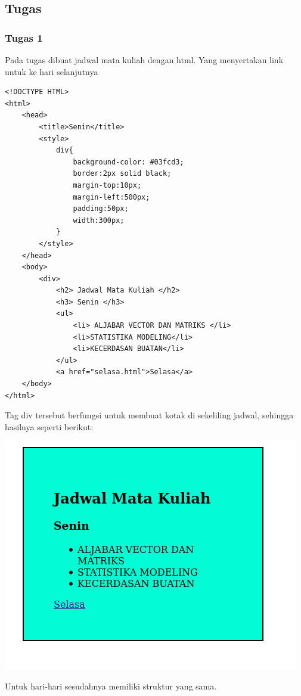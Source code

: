 \documentclass[a4paper,12pt]{article}
\begin{document}
\newpage

\subsection{Tugas}
\subsubsection{Tugas 1}
Pada tugas dibuat jadwal mata kuliah dengan html. Yang menyertakan link untuk ke hari selanjutnya
\begin{lstlisting}
<!DOCTYPE HTML>
<html>
    <head>
        <title>Senin</title>
        <style>
            div{
                background-color: #03fcd3;
                border:2px solid black;
                margin-top:10px;
                margin-left:500px;
                padding:50px;
                width:300px;
            }
        </style>
    </head>
    <body>
        <div>
            <h2> Jadwal Mata Kuliah </h2>
            <h3> Senin </h3>
            <ul>
                <li> ALJABAR VECTOR DAN MATRIKS </li>
                <li>STATISTIKA MODELING</li>
                <li>KECERDASAN BUATAN</li>
            </ul>
            <a href="selasa.html">Selasa</a>
    </body>
</html>
\end{lstlisting}
Tag div tersebut berfungsi untuk membuat kotak di sekeliling jadwal, sehingga hasilnya seperti berikut:\\
\begin{center}
    \includegraphics[scale=.7]{tugas1.png}
\end{center}
Untuk hari-hari sesudahnya memiliki struktur yang sama.
\end{document}

